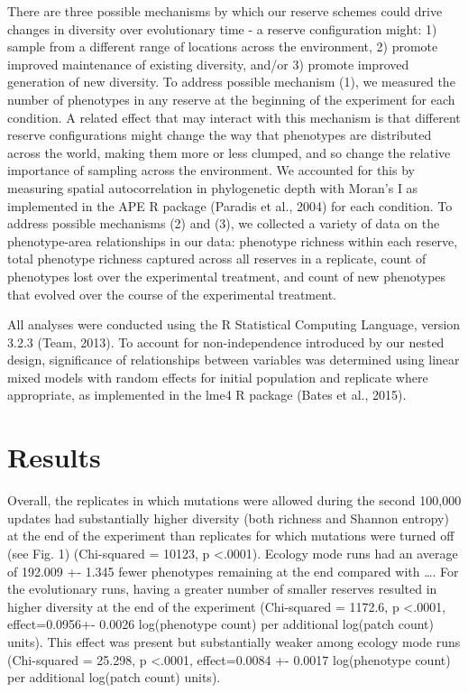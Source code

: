 \documentclass[letterpaper]{article}
\begin{document}
	There are three possible mechanisms by which our reserve schemes could drive changes in diversity over evolutionary time - a reserve configuration might: 1) sample from a different range of locations across the environment, 2) promote improved maintenance of existing diversity, and/or 3)  promote improved generation of new diversity. To address possible mechanism (1), we measured the number of phenotypes in any reserve at the beginning of the experiment for each condition. A related effect  that may interact with this mechanism is that different reserve configurations might change the way that phenotypes are distributed across the world, making them more or less clumped, and so change the relative importance of sampling across the environment. We accounted for this by measuring spatial autocorrelation in phylogenetic depth with Moran's I as implemented in the APE R package (Paradis et al., 2004) for each condition. To address possible mechanisms (2) and (3), we collected a variety of data on the phenotype-area relationships in our data: phenotype richness within each reserve, total phenotype richness captured across all reserves in a replicate, count of phenotypes lost over the experimental treatment, and count of new phenotypes that evolved over the course of the experimental treatment.
    
	All analyses were conducted using the R Statistical Computing Language, version 3.2.3 (Team, 2013). To account for non-independence introduced by our nested design, significance of relationships between variables was determined using linear mixed models with random effects for initial population and replicate where appropriate, as implemented in the lme4 R package (Bates et al., 2015).

\section{Results}

Overall, the replicates in which mutations were allowed during the second 100,000 updates had substantially higher diversity (both richness and Shannon entropy) at the end of the experiment than replicates for which mutations were turned off (see Fig. 1) (Chi-squared = 10123, p <.0001). Ecology mode runs had an average of 192.009 +- 1.345 fewer phenotypes remaining at the end compared with …. For the evolutionary runs, having a greater number of smaller reserves resulted in higher diversity at the end of the experiment (Chi-squared = 1172.6, p <.0001, effect=0.0956+- 0.0026 log(phenotype count) per additional log(patch count) units). This effect was present but substantially weaker among ecology mode runs (Chi-squared = 25.298, p <.0001, effect=0.0084 +- 0.0017 log(phenotype count) per additional log(patch count) units). 
\end{document}
